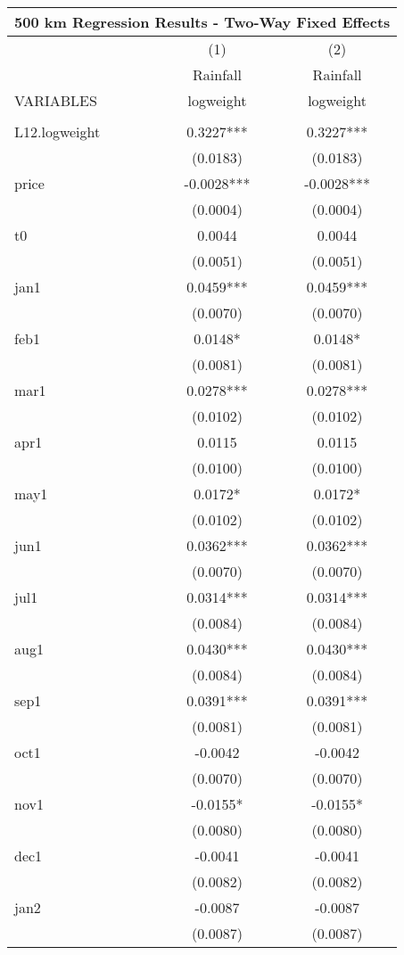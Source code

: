 \documentclass[]{article}
\begin{document}
\begin{tabular}{lcc}
\multicolumn{3}{c}{\huge 500 km Regression Results - Two-Way Fixed Effects} \\ \hline
 & (1) & (2) \\
 & \Large Rainfall & \Large Rainfall \\
VARIABLES & logweight & logweight \\ \hline
 &  &  \\
L12.logweight & 0.3227*** & 0.3227*** \\
 & (0.0183) & (0.0183) \\
price & -0.0028*** & -0.0028*** \\
 & (0.0004) & (0.0004) \\
t0 & 0.0044 & 0.0044 \\
 & (0.0051) & (0.0051) \\
jan1 & 0.0459*** & 0.0459*** \\
 & (0.0070) & (0.0070) \\
feb1 & 0.0148* & 0.0148* \\
 & (0.0081) & (0.0081) \\
mar1 & 0.0278*** & 0.0278*** \\
 & (0.0102) & (0.0102) \\
apr1 & 0.0115 & 0.0115 \\
 & (0.0100) & (0.0100) \\
may1 & 0.0172* & 0.0172* \\
 & (0.0102) & (0.0102) \\
jun1 & 0.0362*** & 0.0362*** \\
 & (0.0070) & (0.0070) \\
jul1 & 0.0314*** & 0.0314*** \\
 & (0.0084) & (0.0084) \\
aug1 & 0.0430*** & 0.0430*** \\
 & (0.0084) & (0.0084) \\
sep1 & 0.0391*** & 0.0391*** \\
 & (0.0081) & (0.0081) \\
oct1 & -0.0042 & -0.0042 \\
 & (0.0070) & (0.0070) \\
nov1 & -0.0155* & -0.0155* \\
 & (0.0080) & (0.0080) \\
dec1 & -0.0041 & -0.0041 \\
 & (0.0082) & (0.0082) \\
jan2 & -0.0087 & -0.0087 \\
 & (0.0087) & (0.0087) \\

\end{tabular}
\end{document}
